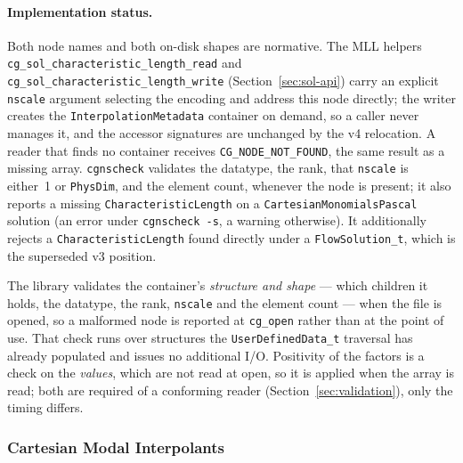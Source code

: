 \documentclass[11pt,letterpaper]{article}
\newif\ifvfourdraft
\newcommand{\vfourmark}{\ifvfourdraft\textcolor{v4violet}{\textbf{[v4]}}\ \fi}
\begin{document}
\paragraph{Implementation status.}
Both node names and both on-disk shapes are normative.  The MLL helpers
\texttt{cg\_sol\_characteristic\_length\_read} and
\texttt{cg\_sol\_characteristic\_length\_write} (Section~\ref{sec:sol-api}) carry an
explicit \texttt{nscale} argument selecting the encoding and address this node
directly; \vfourmark the writer creates the \texttt{InterpolationMetadata}
container on demand, so a caller never manages it, and the accessor signatures are
unchanged by the v4 relocation.  A reader that finds no container receives
\texttt{CG\_NODE\_NOT\_FOUND}, the same result as a missing array.
\texttt{cgnscheck} validates the datatype, the rank, that \texttt{nscale} is
either~1 or \texttt{PhysDim}, and the element count, whenever the node is present; it
also reports a missing \texttt{CharacteristicLength} on a \texttt{CartesianMonomialsPascal}
solution (an error under \texttt{cgnscheck -s}, a warning otherwise).
\vfourmark It additionally rejects a \texttt{CharacteristicLength} found directly
under a \texttt{FlowSolution\_t}, which is the superseded v3 position.

\vfourmark The library validates the container's \emph{structure and shape} ---
which children it holds, the datatype, the rank, \texttt{nscale} and the element
count --- when the file is opened, so a malformed node is reported at
\texttt{cg\_open} rather than at the point of use.  That check runs over
structures the \texttt{UserDefinedData\_t} traversal has already populated and
issues no additional I/O.  Positivity of the factors is a check on the
\emph{values}, which are not read at open, so it is applied when the array is
read; both are required of a conforming reader
(Section~\ref{sec:validation}), only the timing differs.

\subsubsection{Cartesian Modal Interpolants}
\end{document}
